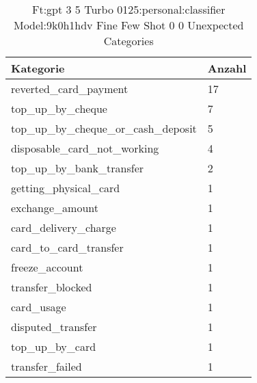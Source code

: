 
    \begin{table}[!ht]
        \centering
        \begin{tabularx}{\textwidth}{X X}
\toprule
\textbf{Kategorie} & \textbf{Anzahl} \\
\midrule
reverted\_card\_payment & \num{17} \\
top\_up\_by\_cheque & \num{7} \\
top\_up\_by\_cheque\_or\_cash\_deposit & \num{5} \\
disposable\_card\_not\_working & \num{4} \\
top\_up\_by\_bank\_transfer & \num{2} \\
getting\_physical\_card & \num{1} \\
exchange\_amount & \num{1} \\
card\_delivery\_charge & \num{1} \\
card\_to\_card\_transfer & \num{1} \\
freeze\_account & \num{1} \\
transfer\_blocked & \num{1} \\
card\_usage & \num{1} \\
disputed\_transfer & \num{1} \\
top\_up\_by\_card & \num{1} \\
transfer\_failed & \num{1} \\
\bottomrule
\end{tabularx}

        \caption{Ft:gpt 3 5 Turbo 0125:personal:classifier Model:9k0h1hdv Fine Few Shot 0 0 Unexpected Categories}
        \label{tab:ft:gpt-3-5-turbo-0125:personal:classifier-model:9k0H1hdV-fine-few-shot-0-0-unexpected-categories}
    \end{table}
    